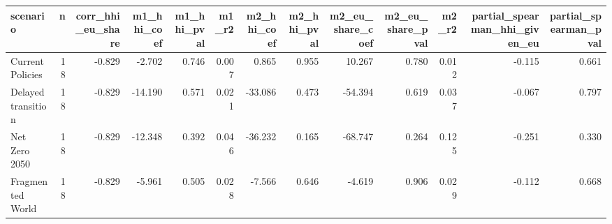 \begin{tabular}{lrrrrrrrrrrrr}
\toprule
scenario & n & corr_hhi_eu_share & m1_hhi_coef & m1_hhi_pval & m1_r2 & m2_hhi_coef & m2_hhi_pval & m2_eu_share_coef & m2_eu_share_pval & m2_r2 & partial_spearman_hhi_given_eu & partial_spearman_pval \\
\midrule
Current Policies & 18 & -0.829 & -2.702 & 0.746 & 0.007 & 0.865 & 0.955 & 10.267 & 0.780 & 0.012 & -0.115 & 0.661 \\
Delayed transition & 18 & -0.829 & -14.190 & 0.571 & 0.021 & -33.086 & 0.473 & -54.394 & 0.619 & 0.037 & -0.067 & 0.797 \\
Net Zero 2050 & 18 & -0.829 & -12.348 & 0.392 & 0.046 & -36.232 & 0.165 & -68.747 & 0.264 & 0.125 & -0.251 & 0.330 \\
Fragmented World & 18 & -0.829 & -5.961 & 0.505 & 0.028 & -7.566 & 0.646 & -4.619 & 0.906 & 0.029 & -0.112 & 0.668 \\
\bottomrule
\end{tabular}
